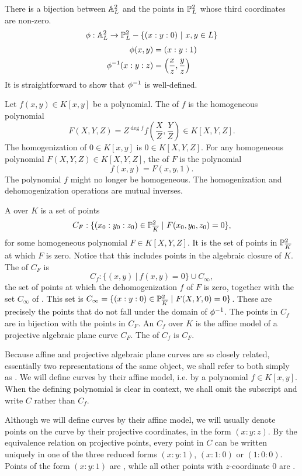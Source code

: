 There is a bijection between $\mathbb{A}_L^2$ and the points in $\mathbb{P}_L^2$ whose third coordinates are non-zero.
\[ \phi : \mathbb{A}_L^2 \to \mathbb{P}_L^2 - \{ (x:y:0) ~|~ x, y \in L \} \]
\begin{align*}
  \phi(x, y) &= (x : y : 1) \\
  \phi^{-1}(x : y : z) &= \left( \frac x z, \frac y z \right)
\end{align*}
It is straightforward to show that $\phi^{-1}$ is well-defined.

Let $f(x,y) \in K[x,y]$ be a polynomial.
The  of $f$ is the homogeneous polynomial
\[ F(X,Y,Z) = Z^{\deg f} f\left( \frac X Z, \frac Y Z \right) \in K[X,Y,Z]. \]
The homogenization of $0 \in K[x,y]$ is $0 \in K[X,Y,Z]$.
For any homogeneous polynomial $F(X,Y,Z) \in K[X,Y,Z]$,
the  of $F$ is the polynomial
\[ f(x,y) = F(x, y, 1). \]
The polynomial $f$ might no longer be homogeneous.
The homogenization and dehomogenization operations are mutual inverses.

A  over $K$ is a set of points
\[ C_F : \{ (x_0 : y_0 : z_0) \in \mathbb{P}_{\overline K}^2 ~|~ F(x_0, y_0, z_0) = 0 \}, \]
for some homogeneous polynomial $F \in K[X, Y, Z]$.
It is the set of points in $\mathbb{P}_{\overline K}^2$ at which $F$ is zero.
Notice that this includes points in the algebraic closure of $K$.
The  of $C_F$ is
\[ C_f : \{ (x, y) ~|~ f(x,y) = 0 \} \cup C_\infty, \]
the set of points at which the dehomogenization $f$ of $F$ is zero,
together with the set $C_\infty$ of .
This set is $C_\infty = \{ (x:y:0) \in \mathbb{P}_{\overline K}^2 ~|~ F(X,Y,0) = 0 \}$.
These are precisely the points that do not fall under the domain of $\phi^{-1}$.
The points in $C_f$ are in bijection with the points in $C_F$.
An  $C_f$ over $K$
is the affine model of a projective algebraic plane curve $C_F$.
The  of $C_f$ is $C_F$.

Because affine and projective algebraic plane curves are so closely related,
essentially two representations of the same object,
we shall refer to both simply as .
We will define curves by their affine model, i.e. by a polynomial $f \in K[x,y]$.
When the defining polynomial is clear in context, we shall omit the subscript and write $C$ rather than $C_f$.

Although we will define curves by their affine model,
we will usually denote points on the curve by their projective coordinates, in the form $(x:y:z)$.
By the equivalence relation on projective points,
every point in $C$ can be written uniquely in one of the three reduced forms $(x:y:1)$, $(x:1:0)$ or $(1:0:0)$.
Points of the form $(x:y:1)$ are ,
while all other points with $z$-coordinate 0 are .

